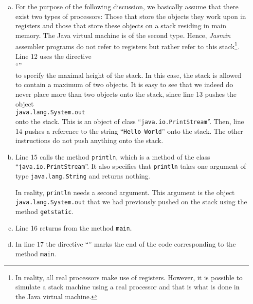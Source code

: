 \begin{enumerate}
\begin{enumerate}[(a)]
  \item For the purpose of the following discussion, we basically assume that there exist two types of
        processors: Those that store the objects they work upon in registers and those that store
        these objects on a stack residing in main memory.  The Java virtual machine is of the second
        type.  Hence, \textsl{Jasmin} assembler programs do not refer to registers but rather refer to
        this stack\footnote{
          In reality, all real processors make use of registers.  However, it is possible 
          to simulate a stack machine using a real processor and that is what is done in the Java
          virtual machine.}.
        Line 12 uses the directive
        \\[0.2cm]
        \hspace*{1.3cm}
        ``\texttt{}''
        \\[0.2cm]
        to specify the maximal height of the
        stack.  In this case, the stack is allowed to contain a maximum of two objects.  It is easy
        to see that we indeed do never place more than two objects onto the stack, since line
        13 pushes the object 
        \\[0.2cm]
        \hspace*{1.3cm}
        \texttt{java.lang.System.out}
        \\[0.2cm]
        onto the stack.  This is an object of class ``\texttt{java.io.PrintStream}''.
        Then, line 14 pushes a reference to the string ``\texttt{Hello World}'' onto the stack.
        The other instructions do not push anything onto the stack.
  \item Line 15 calls the method \texttt{println}, which is a method of the class
        ``\texttt{java.io.PrintStream}''.  It also specifies that \texttt{println} takes one argument of
        type \texttt{java.lang.String} and returns nothing.

        In reality, \texttt{println} needs a second argument.  This argument is the object
        \texttt{java.lang.System.out} that we had previously pushed on the stack using the method \texttt{getstatic}.
  \item Line 16 returns from the method \texttt{main}.
  \item In line 17 the directive ``\texttt{}''  marks the end of the code corresponding to the method 
        \texttt{main}.
  \end{enumerate}
\end{enumerate}

